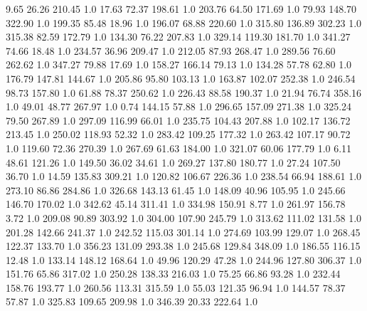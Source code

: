       9.65     26.26    210.45  1.0
     17.63     72.37    198.61  1.0
    203.76     64.50    171.69  1.0
     79.93    148.70    322.90  1.0
    199.35     85.48     18.96  1.0
    196.07     68.88    220.60  1.0
    315.80    136.89    302.23  1.0
    315.38     82.59    172.79  1.0
    134.30     76.22    207.83  1.0
    329.14    119.30    181.70  1.0
    341.27     74.66     18.48  1.0
    234.57     36.96    209.47  1.0
    212.05     87.93    268.47  1.0
    289.56     76.60    262.62  1.0
    347.27     79.88     17.69  1.0
    158.27    166.14     79.13  1.0
    134.28     57.78     62.80  1.0
    176.79    147.81    144.67  1.0
    205.86     95.80    103.13  1.0
    163.87    102.07    252.38  1.0
    246.54     98.73    157.80  1.0
     61.88     78.37    250.62  1.0
    226.43     88.58    190.37  1.0
     21.94     76.74    358.16  1.0
     49.01     48.77    267.97  1.0
      0.74    144.15     57.88  1.0
    296.65    157.09    271.38  1.0
    325.24     79.50    267.89  1.0
    297.09    116.99     66.01  1.0
    235.75    104.43    207.88  1.0
    102.17    136.72    213.45  1.0
    250.02    118.93     52.32  1.0
    283.42    109.25    177.32  1.0
    263.42    107.17     90.72  1.0
    119.60     72.36    270.39  1.0
    267.69     61.63    184.00  1.0
    321.07     60.06    177.79  1.0
      6.11     48.61    121.26  1.0
    149.50     36.02     34.61  1.0
    269.27    137.80    180.77  1.0
     27.24    107.50     36.70  1.0
     14.59    135.83    309.21  1.0
    120.82    106.67    226.36  1.0
    238.54     66.94    188.61  1.0
    273.10     86.86    284.86  1.0
    326.68    143.13     61.45  1.0
    148.09     40.96    105.95  1.0
    245.66    146.70    170.02  1.0
    342.62     45.14    311.41  1.0
    334.98    150.91      8.77  1.0
    261.97    156.78      3.72  1.0
    209.08     90.89    303.92  1.0
    304.00    107.90    245.79  1.0
    313.62    111.02    131.58  1.0
    201.28    142.66    241.37  1.0
    242.52    115.03    301.14  1.0
    274.69    103.99    129.07  1.0
    268.45    122.37    133.70  1.0
    356.23    131.09    293.38  1.0
    245.68    129.84    348.09  1.0
    186.55    116.15     12.48  1.0
    133.14    148.12    168.64  1.0
     49.96    120.29     47.28  1.0
    244.96    127.80    306.37  1.0
    151.76     65.86    317.02  1.0
    250.28    138.33    216.03  1.0
     75.25     66.86     93.28  1.0
    232.44    158.76    193.77  1.0
    260.56    113.31    315.59  1.0
     55.03    121.35     96.94  1.0
    144.57     78.37     57.87  1.0
    325.83    109.65    209.98  1.0
    346.39     20.33    222.64  1.0
